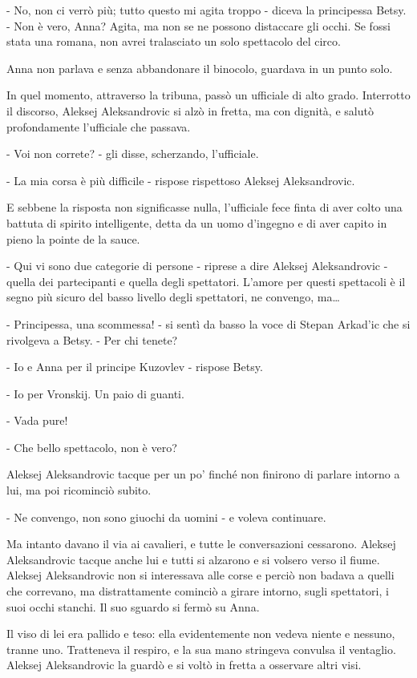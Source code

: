 - No, non ci verrò più; tutto questo mi agita troppo - diceva la principessa Betsy. - Non è vero, Anna? Agita, ma non se ne possono distaccare gli occhi. Se fossi stata una romana, non avrei tralasciato un solo spettacolo del circo. 

Anna non parlava e senza abbandonare il binocolo, guardava in un punto solo. 

In quel momento, attraverso la tribuna, passò un ufficiale di alto grado. Interrotto il discorso, Aleksej Aleksandrovic si alzò in fretta, ma con dignità, e salutò profondamente l'ufficiale che passava. 

- Voi non correte? - gli disse, scherzando, l'ufficiale. 

- La mia corsa è più difficile - rispose rispettoso Aleksej Aleksandrovic. 

E sebbene la risposta non significasse nulla, l'ufficiale fece finta di aver colto una battuta di spirito intelligente, detta da un uomo d'ingegno e di aver capito in pieno la pointe de la sauce. 

- Qui vi sono due categorie di persone - riprese a dire Aleksej Aleksandrovic - quella dei partecipanti e quella degli spettatori. L'amore per questi spettacoli è il segno più sicuro del basso livello degli spettatori, ne convengo, ma\ldots{} 

- Principessa, una scommessa! - si sentì da basso la voce di Stepan Arkad'ic che si rivolgeva a Betsy. - Per chi tenete? 

- Io e Anna per il principe Kuzovlev - rispose Betsy. 

- Io per Vronskij. Un paio di guanti. 

- Vada pure! 

- Che bello spettacolo, non è vero? 

Aleksej Aleksandrovic tacque per un po' finché non finirono di parlare intorno a lui, ma poi ricominciò subito. 

- Ne convengo, non sono giuochi da uomini - e voleva continuare. 

Ma intanto davano il via ai cavalieri, e tutte le conversazioni cessarono. Aleksej Aleksandrovic tacque anche lui e tutti si alzarono e si volsero verso il fiume. Aleksej Aleksandrovic non si interessava alle corse e perciò non badava a quelli che correvano, ma distrattamente cominciò a girare intorno, sugli spettatori, i suoi occhi stanchi. Il suo sguardo si fermò su Anna. 

Il viso di lei era pallido e teso: ella evidentemente non vedeva niente e nessuno, tranne uno. Tratteneva il respiro, e la sua mano stringeva convulsa il ventaglio. Aleksej Aleksandrovic la guardò e si voltò in fretta a osservare altri visi. 


